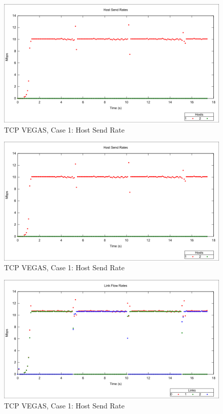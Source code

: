 \begin{figure}[htbp]
    \centering
    \includegraphics[width=\textwidth]{vegas1/Host_Send.png}
    \caption{TCP VEGAS, Case 1: Host Send Rate}
\end{figure}

\begin{figure}[htbp]
    \centering
    \includegraphics[width=\textwidth]{vegas1/Host_Send.png}
    \caption{TCP VEGAS, Case 1: Host Send Rate}
\end{figure}


\begin{figure}[htbp]
    \centering
    \includegraphics[width=\textwidth]{vegas1/Link_Flow_Rate.png}
    \caption{TCP VEGAS, Case 1: Host Send Rate}
\end{figure}

